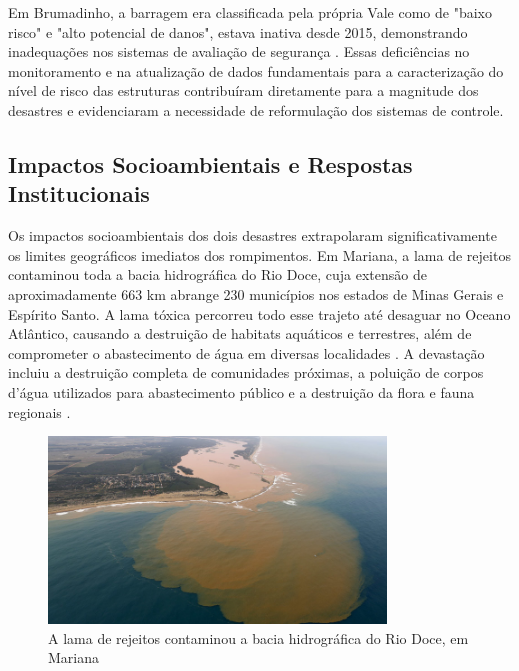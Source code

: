 Em Brumadinho, a barragem era classificada pela própria Vale como de "baixo risco" e "alto potencial de danos", estava inativa desde 2015, demonstrando inadequações nos sistemas de avaliação de segurança \cite{wikipedia2019brumadinho}. Essas deficiências no monitoramento e na atualização de dados fundamentais para a caracterização do nível de risco das estruturas contribuíram diretamente para a magnitude dos desastres e evidenciaram a necessidade de reformulação dos sistemas de controle.

\subsection{Impactos Socioambientais e Respostas Institucionais}

Os impactos socioambientais dos dois desastres extrapolaram significativamente os limites geográficos imediatos dos rompimentos. Em Mariana, a lama de rejeitos contaminou toda a bacia hidrográfica do Rio Doce, cuja extensão de aproximadamente 663 km abrange 230 municípios nos estados de Minas Gerais e Espírito Santo. A lama tóxica percorreu todo esse trajeto até desaguar no Oceano Atlântico, causando a destruição de habitats aquáticos e terrestres, além de comprometer o abastecimento de água em diversas localidades \cite{wikipedia2019brumadinho, brasil2024timeline}. A devastação incluiu a destruição completa de comunidades próximas, a poluição de corpos d'água utilizados para abastecimento público e a destruição da flora e fauna regionais \cite{estadominas2016irregular}.

\begin{figure}[htbp]
    \centering
    \includegraphics[width=0.8\textwidth]{figures/image38_lama_bacia_rio_doce_mariana.jpg}
    \caption{A lama de rejeitos contaminou a bacia hidrográfica do Rio Doce, em Mariana}
    \label{fig:lama_bacia_rio_doce}
\end{figure}

